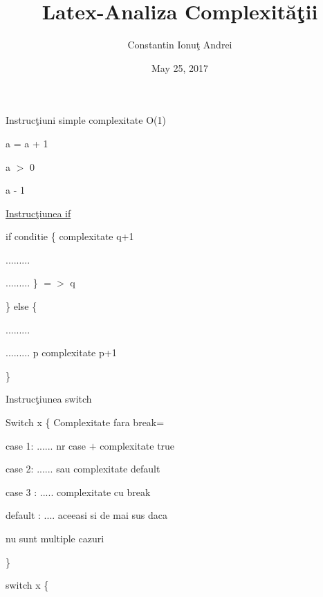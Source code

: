 \documentclass{article}
\title{Latex-Analiza Complexit\u {a}\c {t}ii }
\author{Constantin Ionu\c {t} Andrei }
\date{May 25, 2017}
\begin{document}
\maketitle
\large{
{Instruc\c{t}iuni simple complexitate O(1)}

a = a + 1

a $>$ 0

a - 1

\underline{Instruc\c{t}iunea if}

if conditie  \{     \hspace{100}         complexitate q+1

  \hspace{13} ......... 
   
  \hspace{13} ......... \} $=>$ q
  
  \} else \{
  
  \hspace{13} .........
  
  \hspace{13} .........  p \hspace{100} complexitate p+1
  
  \}
  
  Instruc\c{t}iunea switch
  
  Switch \hspace{7} x \hspace{7} \{ \hspace{70} Complexitate fara break=
  
  \hspace{22} case 1: ...... \hspace{60} nr case $+$ complexitate true
  
  \hspace{22} case 2: ...... \hspace{75} sau complexitate default
  
   
  
  \hspace{22} case 3 : ..... \hspace{60} complexitate cu break
  
  \hspace{22} default : .... \hspace{75} aceeasi si de mai sus daca
  
  \hspace{170} nu sunt multiple cazuri
  
  \}
  
  \hspace{22} switch \hspace{7} x \hspace{7} \{
  
}
\end{document}
